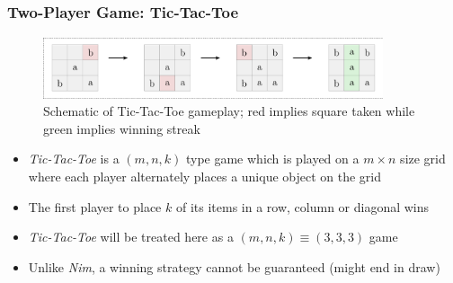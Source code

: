 \documentclass{beamer}
\begin{document}
\subsection{}
\begin{framefont}{\footnotesize}
  \begin{frame}
    \frametitle{Two-Player Game: Tic-Tac-Toe}
    \begin{figure}
      \centering
      \includegraphics[trim={0.3cm 0.3cm 0.3cm 0.3cm},clip,width=10cm]{TTT.png}
      \vspace{5pt}
      \caption{Schematic of Tic-Tac-Toe gameplay; red implies square taken while green implies winning streak}
    \end{figure}
    \begin{itemize}[<+->] 
      \setlength\itemsep{1em}
    \item \textit{Tic-Tac-Toe} is a $(m,n,k)$ type game which is played on a $m \times n$ size grid where each player alternately places a unique object on the grid
    \item The first player to place $k$ of its items in a row, column or diagonal wins
    \item \textit{Tic-Tac-Toe} will be treated here as a $(m,n,k)\equiv(3,3,3)$ game
    \item Unlike \textit{Nim}, a winning strategy cannot be guaranteed (might end in draw)
    \end{itemize}
  \end{frame}
\end{framefont}
\end{document}
